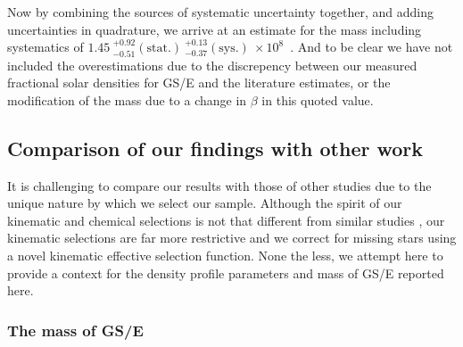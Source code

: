 Now by combining the sources of systematic uncertainty together, and adding uncertainties in quadrature, we arrive at an estimate for the mass including systematics of $1.45\ ^{+0.92}_{-0.51} \mathrm{(stat.)}\ ^{+0.13}_{-0.37} \mathrm{(sys.)}\ \times10^{8}$~\Msun. And to be clear we have not included the overestimations due to the discrepency between our measured fractional solar densities for GS/E and the literature estimates, or the modification of the mass due to a change in $\beta$ in this quoted value.

\subsection{Comparison of our findings with other work}
\label{ch3:subsec:comparison-with-other-work}

It is challenging to compare our results with those of other studies due to the unique nature by which we select our sample. Although the spirit of our kinematic and chemical selections is not that different from similar studies \parencite[e.g.][]{mackereth20,han22}, our kinematic selections are far more restrictive and we correct for missing stars using a novel kinematic effective selection function. None the less, we attempt here to provide a context for the density profile parameters and mass of GS/E reported here.

\subsubsection{The mass of GS/E}

